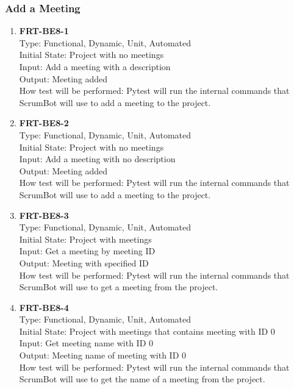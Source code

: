 \documentclass[12pt, titlepage]{article}
\begin{document}
\subsubsection{Add a Meeting}
\begin{enumerate}
    \item{\textbf{FRT-BE8-1}}\\
    Type: Functional, Dynamic, Unit, Automated\\
    Initial State: Project with no meetings\\
    Input: Add a meeting with a description\\
    Output: Meeting added\\
    How test will be performed: Pytest will run the internal commands that ScrumBot will use to add a meeting to the project.
    
    \item{\textbf{FRT-BE8-2}}\\
    Type: Functional, Dynamic, Unit, Automated\\
    Initial State: Project with no meetings\\
    Input: Add a meeting with no description\\
    Output: Meeting added\\
    How test will be performed: Pytest will run the internal commands that ScrumBot will use to add a meeting to the project.
    
    \item{\textbf{FRT-BE8-3}}\\
    Type: Functional, Dynamic, Unit, Automated\\
    Initial State: Project with meetings\\
    Input: Get a meeting by meeting ID\\
    Output: Meeting with specified ID\\
    How test will be performed: Pytest will run the internal commands that ScrumBot will use to get a meeting from the project.
    
    \item{\textbf{FRT-BE8-4}}\\
    Type: Functional, Dynamic, Unit, Automated\\
    Initial State: Project with meetings that contains meeting with ID 0\\
    Input: Get meeting name with ID 0\\
    Output: Meeting name of meeting with ID 0\\
    How test will be performed: Pytest will run the internal commands that ScrumBot will use to get the name of a meeting from the project.
    

\end{enumerate}
\end{document}
